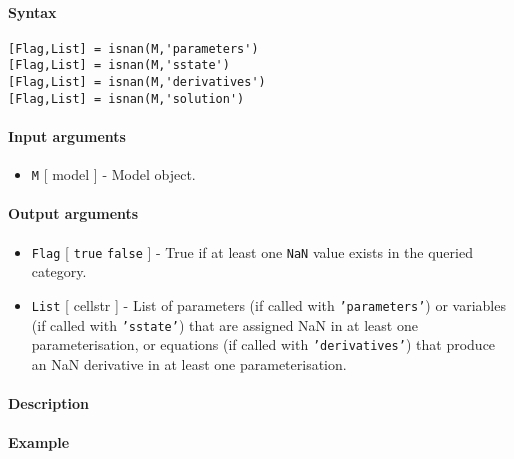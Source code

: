 


	\paragraph{Syntax}\label{syntax}

\begin{verbatim}
[Flag,List] = isnan(M,'parameters')
[Flag,List] = isnan(M,'sstate')
[Flag,List] = isnan(M,'derivatives')
[Flag,List] = isnan(M,'solution')
\end{verbatim}

\paragraph{Input arguments}\label{input-arguments}

\begin{itemize}
\itemsep1pt\parskip0pt
\item
  \texttt{M} {[} model {]} - Model object.
\end{itemize}

\paragraph{Output arguments}\label{output-arguments}

\begin{itemize}
\item
  \texttt{Flag} {[} \texttt{true} \textbar{} \texttt{false} {]} - True
  if at least one \texttt{NaN} value exists in the queried category.
\item
  \texttt{List} {[} cellstr {]} - List of parameters (if called with
  \texttt{'parameters'}) or variables (if called with \texttt{'sstate'})
  that are assigned NaN in at least one parameterisation, or equations
  (if called with \texttt{'derivatives'}) that produce an NaN derivative
  in at least one parameterisation.
\end{itemize}

\paragraph{Description}\label{description}

\paragraph{Example}\label{example}


